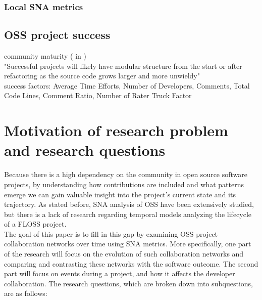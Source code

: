 \subsubsection{Local SNA metrics}


\subsection{OSS project success}
community maturity (\cite{linBlogCommunityDiscovery2007} in \cite{aljemabiEmpiricalStudyEvolution2018}) \\

"Successful projects will likely have modular structure from the start or after refactoring as the source code grows larger and more unwieldy" \cite{antwerpEvolutionOpenSource2010} \\

success factors: Average Time Efforts, Number of Developers, Comments, Total Code Lines, Comment Ratio, Number of Rater \cite{yangHowMicrobloggingNetworks2013}
Truck Factor \cite{avelinoNovelApproachEstimating2016}


\section{Motivation of research problem and research questions}
Because there is a high dependency on the community in open source software projects, by understanding how contributions are included and what patterns emerge we can gain valuable insight into the project's current state and its trajectory. As stated before, SNA analysis of OSS have been extensively studied, but there is a lack of research regarding temporal models analyzing the lifecycle of a FLOSS project. \\

The goal of this paper is to fill in this gap by examining OSS project collaboration networks over time using SNA metrics. More specifically, one part of the research will focus on the evolution of such collaboration networks and comparing and contrasting these networks with the software outcome. The second part will focus on events during a project, and how it affects the developer collaboration. The research questions, which are broken down into subquestions, are as follows:

